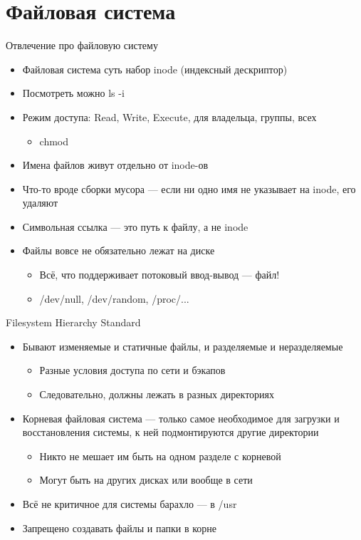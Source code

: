 \documentclass{../../slides-style}
\begin{document}
    \section{Файловая система}

    \begin{frame}{Отвлечение про файловую систему}
        \begin{itemize}
            \item Файловая система суть набор inode (индексный дескриптор)
            \item Посмотреть можно ls -i
            \item Режим доступа: Read, Write, Execute, для владельца, группы, всех
            \begin{itemize}
                \item chmod
            \end{itemize}
            \item Имена файлов живут отдельно от inode-ов
            \item Что-то вроде сборки мусора --- если ни одно имя не указывает на inode, его удаляют
            \item Символьная ссылка --- это путь к файлу, а не inode
            \item Файлы вовсе не обязательно лежат на диске
            \begin{itemize}
                \item Всё, что поддерживает потоковый ввод-вывод --- файл!
                \item /dev/null, /dev/random, /proc/...
            \end{itemize}
        \end{itemize}
    \end{frame}

    \begin{frame}{Filesystem Hierarchy Standard}
        \begin{itemize}
            \item Бывают изменяемые и статичные файлы, и разделяемые и неразделяемые
            \begin{itemize}
                \item Разные условия доступа по сети и бэкапов
                \item Следовательно, должны лежать в разных директориях
            \end{itemize}
            \item Корневая файловая система --- только самое необходимое для загрузки и восстановления системы, к ней подмонтируются другие директории
            \begin{itemize}
                \item Никто не мешает им быть на одном разделе с корневой
                \item Могут быть на других дисках или вообще в сети
            \end{itemize}
            \item Всё не критичное для системы барахло --- в /usr
            \item Запрещено создавать файлы и папки в корне
        \end{itemize}
    \end{frame}
\end{document}
